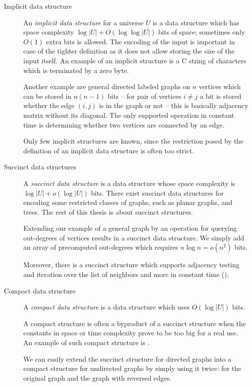 \begin{description}
	\item[Implicit data structure]
	An \emph{implicit data structure} for a universe $U$ is a data structure which has space complexity $ \log |U| + O(\log \log |U|) $ bits of space; sometimes only $O(1)$ extra bits is allowed.
	The encoding of the input is important in case of the tighter definition as it does not allow storing the size of the input itself.
	An example of an implicit structure is a C string of characters which is terminated by a zero byte.
	
	Another example\label{ex:implicit-graph} are general directed labeled graphs on $n$ vertices which can be stored in $n (n - 1)$ bits -- for pair of vertices $i \ne j$ a bit is stored whether the edge $(i, j)$ is in the graph or not -- this is basically adjacency matrix without its diagonal.
	The only supported operation in constant time is determining whether two vertices are connected by an edge.
	
	Only few implicit structures are known, since the restriction posed by the definition of an implicit data structure is often too strict.

	\item[Succinct data structures]
	A \emph{succinct data structure} is a data structure whose space complexity is $ \log |U| + o(\log |U|) $ bits.
	There exist succinct data structures for encoding some restricted classes of graphs, such as planar graphs, and trees.
	The rest of this thesis is about succinct structures.
	
	Extending our example of a general graph by an operation for querying out-degrees of vertices results in a succinct data structure.
	We simply add an array of precomputed out-degrees which requires $n \log n = o(n^2)$ bits.
	
	Moreover, there is a succinct structure which supports adjacency testing and iteration over the list of neighbors and more in constant time (\cite[Theorem~6.1]{raman2007succinct}).
	
	\item[Compact data structure]
	A \emph{compact data structure} is a data structure which uses $ O(\log |U|) $ bits.
	
	A compact structure is often a byproduct of a succinct structure when the constants in space or time complexity prove to be too big for a real use.
	An example of such compact structure is \cite{gonzalez2005practical}.
	
	We can easily extend the succinct structure for directed graphs into a compact structure for undirected graphs by simply using it twice: for the original graph and the graph with reversed edges.
\end{description}

